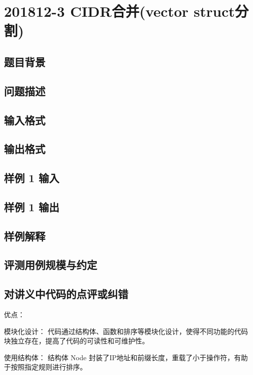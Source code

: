 \section{201812-3 CIDR合并(vector struct分割)}

\subsection{题目背景}

\subsection{问题描述}

\subsection{输入格式}

\subsection{输出格式}

\subsection{样例 1 输入}

\subsection{样例 1 输出}

\subsection{样例解释}

\subsection{评测用例规模与约定}

\subsection{对讲义中代码的点评或纠错}
 
优点：

模块化设计： 代码通过结构体、函数和排序等模块化设计，使得不同功能的代码块独立存在，提高了代码的可读性和可维护性。

使用结构体： 结构体 Node 封装了IP地址和前缀长度，重载了小于操作符，有助于按照指定规则进行排序。

